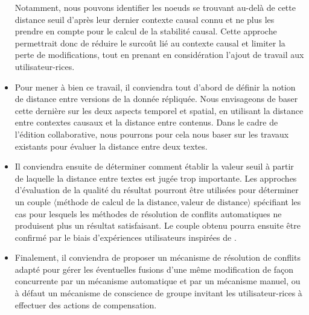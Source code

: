 \begin{itemize}
        Notamment, nous pouvons identifier les noeuds se trouvant au-delà de cette distance seuil d'après leur dernier contexte causal connu et ne plus les prendre en compte pour le calcul de la stabilité causal.
        Cette approche permettrait donc de réduire le surcoût lié au contexte causal et limiter la perte de modifications, tout en prenant en considération l'ajout de travail aux utilisateur-rices.
    \item Pour mener à bien ce travail, il conviendra tout d'abord de définir la notion de distance entre versions de la donnée répliquée.
        Nous envisageons de baser cette dernière sur les deux aspects temporel et spatial, \ie en utilisant la distance entre contextes causaux et la distance entre contenus.
        Dans le cadre de l'édition collaborative, nous pourrons pour cela nous baser sur les travaux existants pour évaluer la distance entre deux textes.
    \item Il conviendra ensuite de déterminer comment établir la valeur seuil à partir de laquelle la distance entre textes est jugée trop importante.
        Les approches d'évaluation de la qualité du résultat pourront être utilisées pour déterminer un couple $\langle \text{méthode de calcul de la distance}, \text{valeur de distance} \rangle$ spécifiant les cas pour lesquels les méthodes de résolution de conflits automatiques ne produisent plus un résultat satisfaisant.
        Le couple obtenu pourra ensuite être confirmé par le biais d'expériences utilisateurs inspirées de \cite{2014-effect-delay-collaborative-editing-ignat,2015-cope-delay-collaborative-note-taking-ignat}.
    \item Finalement, il conviendra de proposer un mécanisme de résolution de conflits adapté pour gérer les éventuelles fusions d'une même modification de façon concurrente par un mécanisme automatique et par un mécanisme manuel, ou à défaut un mécanisme de conscience de groupe invitant les utilisateur-rices à effectuer des actions de compensation.
\end{itemize}
